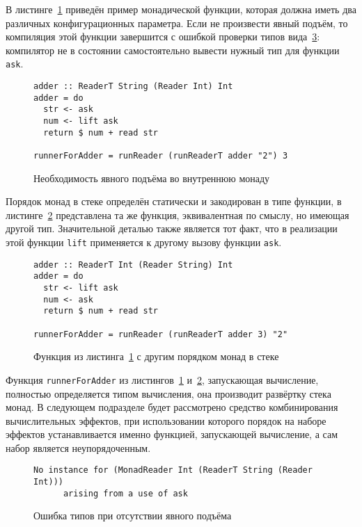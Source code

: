 В листинге~\ref{listing:mtlReadersLift} приведён пример монадической функции, 
которая должна иметь два различных конфигурационных параметра. Если не 
произвести явный подъём, то компиляция этой функции завершится с ошибкой 
проверки типов вида~\ref{listing:mtlCompileError}: компилятор не в состоянии 
самостоятельно вывести нужный тип для функции \lstinline{ask}.

\begin{figure}[t]
\begin{lstlisting}
adder :: ReaderT String (Reader Int) Int
adder = do
  str <- ask
  num <- lift ask
  return $ num + read str

runnerForAdder = runReader (runReaderT adder "2") 3
\end{lstlisting}
\caption{Необходимость явного подъёма во внутреннюю монаду}
\label{listing:mtlReadersLift}
\end{figure}

Порядок монад в стеке определён статически и закодирован в типе функции, 
в листинге~\ref{listing:mtlDifferentReadersLift} представлена та же функция, 
эквивалентная по смыслу, но имеющая другой тип. Значительной деталью также 
является тот факт, что в реализации этой функции \lstinline{lift} применяется 
к другому вызову функции \lstinline{ask}.

\begin{figure}[t]
\begin{lstlisting}
adder :: ReaderT Int (Reader String) Int
adder = do
  str <- lift ask
  num <- ask
  return $ num + read str

runnerForAdder = runReader (runReaderT adder 3) "2"
\end{lstlisting}
\caption{Функция из листинга~\ref{listing:mtlReadersLift} с другим порядком монад в стеке}
\label{listing:mtlDifferentReadersLift}
\end{figure}

Функция \lstinline{runnerForAdder} из листингов~\ref{listing:mtlReadersLift} 
и~\ref{listing:mtlDifferentReadersLift}, запускающая вычисление, полностью 
определяется типом вычисления, она производит развёртку стека монад. 
В следующем подразделе будет рассмотрено средство комбинирования вычислительных 
эффектов, при использовании которого порядок на наборе эффектов устанавливается 
именно функцией, запускающей вычисление, а сам набор является неупорядоченным.

\begin{figure}[t]
\begin{lstlisting}
No instance for (MonadReader Int (ReaderT String (Reader Int)))
      arising from a use of ask
\end{lstlisting}
\caption{Ошибка типов при отсутствии явного подъёма}
\label{listing:mtlCompileError}
\end{figure}

